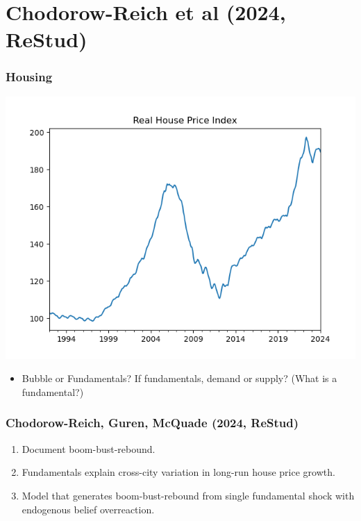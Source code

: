 \documentclass[english,xcolor=svgnames]{beamer}
\begin{document}
\section{Chodorow-Reich et al (2024, ReStud)}

\begin{frame}
	\frametitle[alignment=center]{Housing}
	\begin{center}
		\includegraphics[scale=0.5]{figures/real_house_price.png}
	\end{center}
	\begin{itemize}
		\item Bubble or Fundamentals? If fundamentals, demand or supply? (What is a fundamental?)
	\end{itemize}
\end{frame}

\begin{frame}
	\frametitle[alignment=center]{Chodorow-Reich, Guren, McQuade (2024, ReStud)}
	\begin{enumerate}
		\item Document boom-bust-rebound.
		\item Fundamentals explain cross-city variation in long-run house price growth.
		\item Model that generates boom-bust-rebound from single fundamental shock with endogenous belief overreaction.
	\end{enumerate}
\end{frame}
\end{document}
